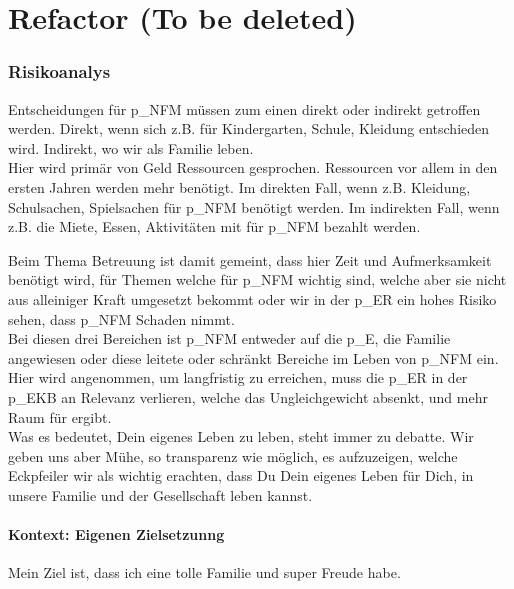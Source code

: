\part{Refactor (To be deleted)}
\section{Risikoanalys}

Entscheidungen für \gls{p_NFM} müssen zum einen direkt oder indirekt getroffen werden.
Direkt, wenn sich z.B. für Kindergarten, Schule, Kleidung entschieden wird. Indirekt, wo wir als Familie leben.\\

Hier wird primär von Geld Ressourcen gesprochen. Ressourcen vor allem in den ersten Jahren werden mehr benötigt. Im direkten Fall, wenn z.B. Kleidung, Schulsachen, Spielsachen für \gls{p_NFM} benötigt werden. Im indirekten Fall, wenn z.B. die Miete, Essen, Aktivitäten mit für \gls{p_NFM} bezahlt werden.

Beim Thema Betreuung ist damit gemeint, dass hier Zeit und Aufmerksamkeit benötigt wird, für Themen welche für \gls{p_NFM} wichtig sind, welche aber sie nicht aus alleiniger Kraft umgesetzt bekommt oder wir in der \gls{p_ER} ein hohes Risiko sehen, dass \gls{p_NFM} Schaden nimmt.\\

Bei diesen drei Bereichen ist \gls{p_NFM} entweder auf die \gls{p_E}, die Familie angewiesen oder diese leitete oder schränkt Bereiche im Leben von \gls{p_NFM} ein. Hier wird angenommen, um  langfristig zu erreichen, muss die \gls{p_ER} in der \gls{p_EKB} an Relevanz verlieren, welche das Ungleichgewicht absenkt, und mehr Raum für  ergibt.\\


Was es bedeutet, Dein eigenes Leben zu leben, steht immer zu debatte. Wir geben uns aber Mühe, so transparenz wie möglich, es aufzuzeigen, welche Eckpfeiler wir als wichtig erachten, dass Du Dein eigenes Leben für Dich, in unsere Familie und der Gesellschaft leben kannst.

\subsection{Kontext: Eigenen Zielsetzunng}

Mein Ziel ist, dass ich eine tolle Familie und super Freude habe.\\

